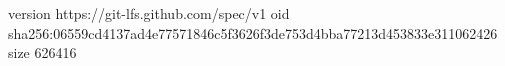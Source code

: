 version https://git-lfs.github.com/spec/v1
oid sha256:06559cd4137ad4e77571846c5f3626f3de753d4bba77213d453833e311062426
size 626416
